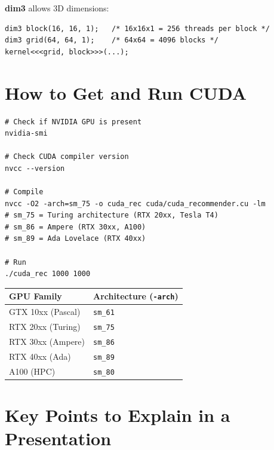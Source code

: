 \documentclass[12pt,a4paper]{article}
\begin{document}
\textbf{dim3} allows 3D dimensions:
\begin{lstlisting}
dim3 block(16, 16, 1);   /* 16x16x1 = 256 threads per block */
dim3 grid(64, 64, 1);    /* 64x64 = 4096 blocks */
kernel<<<grid, block>>>(...);
\end{lstlisting}

\section{How to Get and Run CUDA}

\begin{verbatim}
# Check if NVIDIA GPU is present
nvidia-smi

# Check CUDA compiler version
nvcc --version

# Compile
nvcc -O2 -arch=sm_75 -o cuda_rec cuda/cuda_recommender.cu -lm
# sm_75 = Turing architecture (RTX 20xx, Tesla T4)
# sm_86 = Ampere (RTX 30xx, A100)
# sm_89 = Ada Lovelace (RTX 40xx)

# Run
./cuda_rec 1000 1000
\end{verbatim}

\begin{center}
\begin{tabular}{ll}
\toprule
GPU Family & Architecture (\texttt{-arch}) \\
\midrule
GTX 10xx (Pascal) & \texttt{sm\_61} \\
RTX 20xx (Turing) & \texttt{sm\_75} \\
RTX 30xx (Ampere) & \texttt{sm\_86} \\
RTX 40xx (Ada) & \texttt{sm\_89} \\
A100 (HPC) & \texttt{sm\_80} \\
\bottomrule
\end{tabular}
\end{center}

\section{Key Points to Explain in a Presentation}
\end{document}
